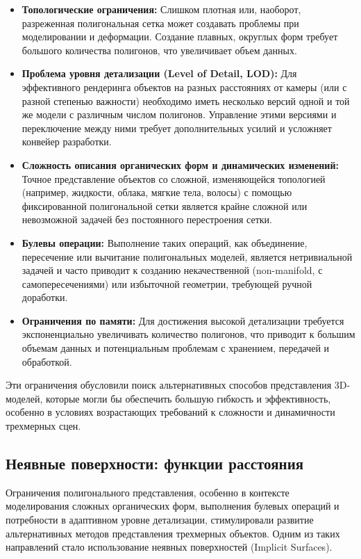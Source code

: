 \begin{itemize}
    \item
    \textbf{Топологические ограничения:} Слишком плотная или, наоборот, разреженная полигональная сетка может создавать проблемы при моделировании и деформации. Создание плавных, округлых форм требует большого количества полигонов, что увеличивает объем данных.
    \item
    \textbf{Проблема уровня детализации (Level of Detail, LOD):} Для эффективного рендеринга объектов на разных расстояниях от камеры (или с разной степенью важности) необходимо иметь несколько версий одной и той же модели с различным числом полигонов. Управление этими версиями и переключение между ними требует дополнительных усилий и усложняет конвейер разработки.
    \item
    \textbf{Сложность описания органических форм и динамических изменений:} Точное представление объектов со сложной, изменяющейся топологией (например, жидкости, облака, мягкие тела, волосы) с помощью фиксированной полигональной сетки является крайне сложной или невозможной задачей без постоянного перестроения сетки.
    \item
    \textbf{Булевы операции:} Выполнение таких операций, как объединение, пересечение или вычитание полигональных моделей, является нетривиальной задачей и часто приводит к созданию некачественной (non-manifold, с самопересечениями) или избыточной геометрии, требующей ручной доработки.
    \item
    \textbf{Ограничения по памяти:} Для достижения высокой детализации требуется экспоненциально увеличивать количество полигонов, что приводит к большим объемам данных и потенциальным проблемам с хранением, передачей и обработкой.
\end{itemize}

Эти ограничения обусловили поиск альтернативных способов представления 3D-моделей, которые могли бы обеспечить большую гибкость и эффективность, особенно в условиях возрастающих требований к сложности и динамичности трехмерных сцен.

\subsection{Неявные поверхности: функции расстояния}
Ограничения полигонального представления, особенно в контексте моделирования сложных органических форм, выполнения булевых операций и потребности в адаптивном уровне детализации, стимулировали развитие альтернативных методов представления трехмерных объектов. Одним из таких направлений стало использование неявных поверхностей (Implicit Surfaces).


